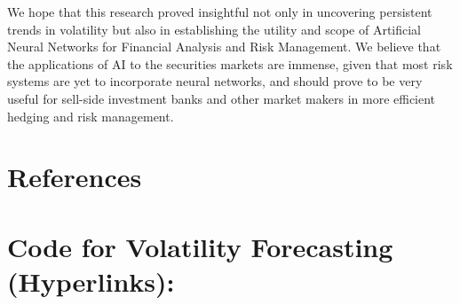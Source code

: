 \documentclass[10pt]{article}
\begin{document}
We hope that this research proved insightful not only in uncovering persistent trends in volatility but also in establishing the utility and scope of Artificial Neural Networks for Financial Analysis and Risk Management. We believe that the applications of AI to the securities markets are immense, given that most risk systems are yet to incorporate neural networks, and should prove to be very useful for sell-side investment banks and other market makers in more efficient hedging and risk management.



\vspace{13cm}
\section{References}




\section{Code for Volatility Forecasting (Hyperlinks):}
\end{document}
